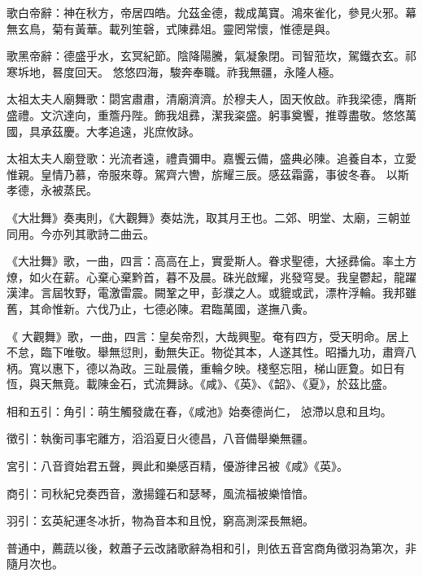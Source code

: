 \begin{pinyinscope}
 歌白帝辭：神在秋方，帝居四皓。允茲金德，裁成萬寶。鴻來雀化，參見火邪。幕無玄鳥，菊有黃華。載列笙磬，式陳彞俎。靈罔常懷，惟德是與。



 歌黑帝辭：德盛乎水，玄冥紀節。陰降陽騰，氣凝象閉。司智蒞坎，駕鐵衣玄。祁寒坼地，晷度回天。
 悠悠四海，駿奔奉職。祚我無疆，永隆人極。



 太祖太夫人廟舞歌：閟宮肅肅，清廟濟濟。於穆夫人，固天攸啟。祚我梁德，膺斯盛禮。文泬達向，重簷丹陛。飾我俎彞，潔我粢盛。躬事奠饗，推尊盡敬。悠悠萬國，具承茲慶。大孝追遠，兆庶攸詠。



 太祖太夫人廟登歌：光流者遠，禮貴彌申。嘉饗云備，盛典必陳。追養自本，立愛惟親。皇情乃慕，帝服來尊。駕齊六轡，旂耀三辰。感茲霜露，事彼冬春。
 以斯孝德，永被蒸民。



 《大壯舞》奏夷則，《大觀舞》奏姑洗，取其月王也。二郊、明堂、太廟，三朝並同用。今亦列其歌詩二曲云。



 《大壯舞》歌，一曲，四言：高高在上，實愛斯人。眷求聖德，大拯彞倫。率土方燎，如火在薪。心棄心棄黔首，暮不及晨。硃光啟耀，兆發穹旻。我皇鬱起，龍躍漢津。言屆牧野，電激雷震。闕鞏之甲，彭濮之人。或貔或武，漂杵浮輪。我邦雖舊，其命惟新。六伐乃止，七德必陳。君臨萬國，遂撫八夤。



 《
 大觀舞》歌，一曲，四言：皇矣帝烈，大哉興聖。奄有四方，受天明命。居上不怠，臨下唯敬。舉無愆則，動無失正。物從其本，人遂其性。昭播九功，肅齊八柄。寬以惠下，德以為政。三趾晨儀，重輪夕映。棧壑忘阻，梯山匪夐。如日有恆，與天無竟。載陳金石，式流舞詠。《咸》、《英》、《韶》、《夏》，於茲比盛。



 相和五引：角引：萌生觸發歲在春，《咸池》始奏德尚仁，
 惉滯以息和且均。



 徵引：執衡司事宅離方，滔滔夏日火德昌，八音備舉樂無疆。



 宮引：八音資始君五聲，興此和樂感百精，優游律呂被《咸》《英》。



 商引：司秋紀兌奏西音，激揚鐘石和瑟琴，風流福被樂愔愔。



 羽引：玄英紀運冬冰折，物為音本和且悅，窮高測深長無絕。



 普通中，薦蔬以後，敕蕭子云改諸歌辭為相和引，則依五音宮商角徵羽為第次，非隨月次也。




\end{pinyinscope}
